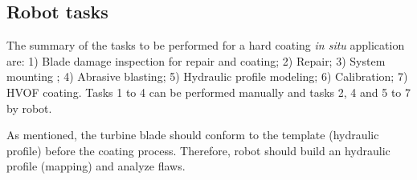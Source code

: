 \subsection{Robot tasks}\label{desc_taref}
The summary of the tasks to be performed for a hard coating \textit{in situ}
application are: 1) Blade damage inspection for repair and coating; 2) Repair; 3)
System mounting ; 4) Abrasive blasting; 5) Hydraulic profile modeling; 6)
Calibration; 7) HVOF coating.
Tasks 1 to 4 can be performed manually and tasks 2, 4 and 5 to 7 by robot. 





As mentioned, the turbine blade should conform
to the template (hydraulic profile) before the coating process. Therefore,
robot should build an hydraulic profile (mapping) and analyze flaws.

